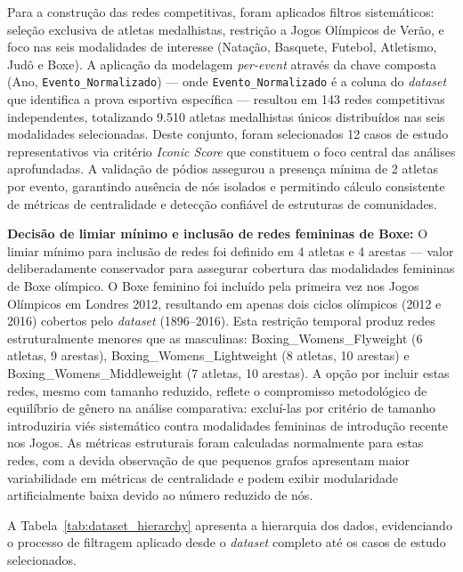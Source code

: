 Para a construção das redes competitivas, foram aplicados filtros sistemáticos: seleção exclusiva de atletas medalhistas, restrição a Jogos Olímpicos de Verão, e foco nas seis modalidades de interesse (Natação, Basquete, Futebol, Atletismo, Judô e Boxe). A aplicação da modelagem \textit{per-event} através da chave composta (Ano, \texttt{Evento\_Normalizado}) --- onde \texttt{Evento\_Normalizado} é a coluna do \textit{dataset} que identifica a prova esportiva específica --- resultou em 143 redes competitivas independentes, totalizando 9.510 atletas medalhistas únicos distribuídos nas seis modalidades selecionadas. Deste conjunto, foram selecionados 12 casos de estudo representativos via critério \textit{Iconic Score}{} que constituem o foco central das análises aprofundadas. A validação de pódios assegurou a presença mínima de 2 atletas por evento, garantindo ausência de nós isolados e permitindo cálculo consistente de métricas de centralidade e detecção confiável de estruturas de comunidades.

\textbf{Decisão de limiar mínimo e inclusão de redes femininas de Boxe:} O limiar mínimo para inclusão de redes foi definido em 4 atletas e 4 arestas --- valor deliberadamente conservador para assegurar cobertura das modalidades femininas de Boxe olímpico. O Boxe feminino foi incluído pela primeira vez nos Jogos Olímpicos em Londres 2012, resultando em apenas dois ciclos olímpicos (2012 e 2016) cobertos pelo \textit{dataset} (1896--2016). Esta restrição temporal produz redes estruturalmente menores que as masculinas: Boxing\_Womens\_Flyweight (6 atletas, 9 arestas), Boxing\_Womens\_Lightweight (8 atletas, 10 arestas) e Boxing\_Womens\_Middleweight (7 atletas, 10 arestas). A opção por incluir estas redes, mesmo com tamanho reduzido, reflete o compromisso metodológico de equilíbrio de gênero na análise comparativa: excluí-las por critério de tamanho introduziria viés sistemático contra modalidades femininas de introdução recente nos Jogos. As métricas estruturais foram calculadas normalmente para estas redes, com a devida observação de que pequenos grafos apresentam maior variabilidade em métricas de centralidade e podem exibir modularidade artificialmente baixa devido ao número reduzido de nós.

A Tabela~\ref{tab:dataset_hierarchy} apresenta a hierarquia dos dados, evidenciando o processo de filtragem aplicado desde o \textit{dataset} completo até os casos de estudo selecionados.



